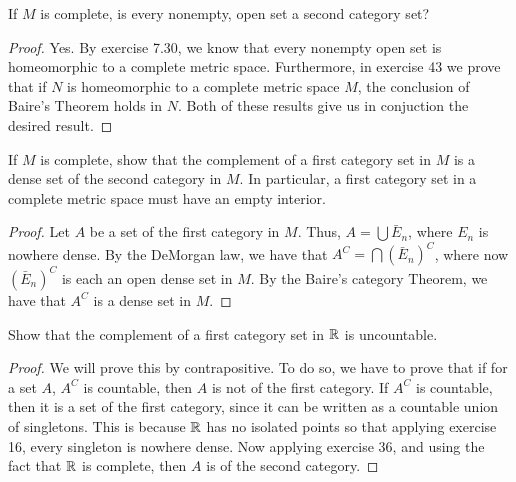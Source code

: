 \begin{exercise}{33}
If $M$ is complete, is every nonempty, open set a second category set?
\end{exercise}
\begin{proof}
Yes.
By exercise 7.30, we know that every nonempty open set is homeomorphic to a complete metric space.
Furthermore, in exercise 43 we prove that if $N$ is homeomorphic to a complete metric space $M$, the conclusion of Baire's Theorem holds in $N$.
Both of these results give us in conjuction the desired result.
\end{proof} 

\begin{exercise}{36}
If $M$ is complete, show that the complement of a first category set in $M$ is a dense set of the second category in $M$.
In particular, a first category set in a complete metric space must have an empty interior.
\end{exercise}
\begin{proof}
Let $A$ be a set of the first category in $M$.
Thus, $A = \bigcup \bar{E}_n$, where $E_n$ is nowhere dense.
By the DeMorgan law, we have that $A^C = \bigcap (\bar{E}_n)^C$, where now $(\bar{E}_n)^C$ is each an open dense set in $M$.
By the Baire's category Theorem, we have that $A^C$ is a dense set in $M$.
\end{proof} 

\begin{exercise}{37}
Show that the complement of a first category set in $\mathbb{R}$ is uncountable.
\end{exercise}
\begin{proof}
We will prove this by contrapositive.
To do so, we have to prove that if for a set $A$, $A^C$ is countable, then $A$ is not of the first category.
If $A^C$ is countable, then it is a set of the first category, since it can be written as a countable union of singletons.
This is because $\mathbb{R}$ has no isolated points so that applying exercise 16, every singleton is nowhere dense.
Now applying exercise 36, and using the fact that $\mathbb{R}$ is complete, then $A$ is of the second category.
\end{proof} 

